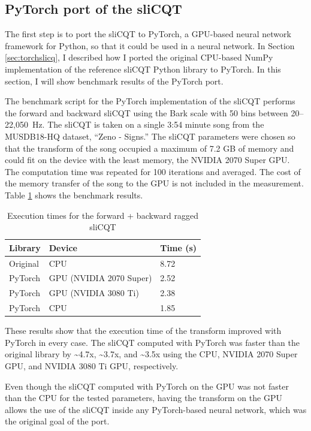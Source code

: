 \documentclass[report.tex]{subfiles}
\begin{document}
\subsection{PyTorch port of the sliCQT}
\label{sec:gpuexperimentpytorch}

The first step is to port the sliCQT to PyTorch, a GPU-based neural network framework for Python, so that it could be used in a neural network. In Section \ref{sec:torchslicq}, I described how I ported the original CPU-based NumPy implementation of the reference sliCQT Python library to PyTorch. In this section, I will show benchmark results of the PyTorch port.

The benchmark script for the PyTorch implementation of the sliCQT performs the forward and backward sliCQT using the Bark scale with 50 bins between \mbox{20--22,050 Hz}. The sliCQT is taken on a single 3:54 minute song from the MUSDB18-HQ dataset, ``Zeno - Signs.'' The sliCQT parameters were chosen so that the transform of the song occupied a maximum of 7.2 GB of memory and could fit on the device with the least memory, the NVIDIA 2070 Super GPU. The computation time was repeated for 100 iterations and averaged. The cost of the memory transfer of the song to the GPU is not included in the measurement. Table \ref{table:nsgttorchresultsragged} shows the benchmark results.

\begin{table}[ht]
	\centering
	\caption{Execution times for the forward + backward ragged sliCQT}
	\label{table:nsgttorchresultsragged}
	\begin{tabular}{ |l|l|l| }
	 \hline
		Library & Device & Time (s) \\
	 \hline
	 \hline
		Original & CPU & 8.72 \\
	 \hline
		PyTorch & GPU (NVIDIA 2070 Super) & 2.52 \\
	 \hline
		PyTorch & GPU (NVIDIA 3080 Ti) & 2.38 \\
	 \hline
		PyTorch & CPU & 1.85 \\
	 \hline
\end{tabular}
\end{table}

These results show that the execution time of the transform improved with PyTorch in every case. The sliCQT computed with PyTorch was faster than the original library by \textasciitilde4.7x, \textasciitilde3.7x, and \textasciitilde3.5x using the CPU, NVIDIA 2070 Super GPU, and NVIDIA 3080 Ti GPU, respectively.

Even though the sliCQT computed with PyTorch on the GPU was not faster than the CPU for the tested parameters, having the transform on the GPU allows the use of the sliCQT inside any PyTorch-based neural network, which was the original goal of the port.
\end{document}
